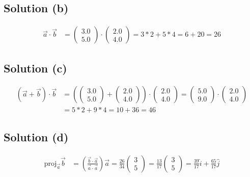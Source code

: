 \documentclass[12pt]{article}
\newcommand{\proj}{\text{proj}}
\begin{document}
\subsection{Solution (b)}
\begin{align*}
    \vec{a} \cdot \vec{b}  &=  \begin{pmatrix} 3.0 \\ 5.0 \end{pmatrix} \cdot \begin{pmatrix} 2.0 \\ 4.0 \end{pmatrix}
        =   3*2 + 5*4
        =   6 + 20
        =   \boxed {26}
\end{align*}

\subsection{Solution (c)}
\begin{align*}
    \left(\vec{a} + \vec{b}\right) \cdot \vec{b}    &=  \left(\begin{pmatrix} 3.0 \\ 5.0 \end{pmatrix} + \begin{pmatrix} 2.0 \\ 4.0 \end{pmatrix}\right) \cdot \begin{pmatrix} 2.0 \\ 4.0 \end{pmatrix}
        =   \begin{pmatrix} 5.0 \\ 9.0 \end{pmatrix} \cdot \begin{pmatrix} 2.0 \\ 4.0 \end{pmatrix}\\
        &=  5 * 2 + 9 * 4
        =   10 + 36
        =   \boxed{46}
\end{align*}

\subsection{Solution (d)}
\begin{align*}
    \proj_{\vec{a}} \vec{b} &=  \left(\frac{\vec{b} \cdot \vec{a}}{\vec{a} \cdot \vec{a}}\right)\vec{a}
        =   \frac{26}{34} \begin{pmatrix} 3\\5 \end{pmatrix}
        =   \frac{13}{17} \begin{pmatrix} 3\\5 \end{pmatrix}
        =   \boxed{\frac{39}{17}\hat{i} + \frac{65}{17}\hat{j}}
\end{align*}
\end{document}
